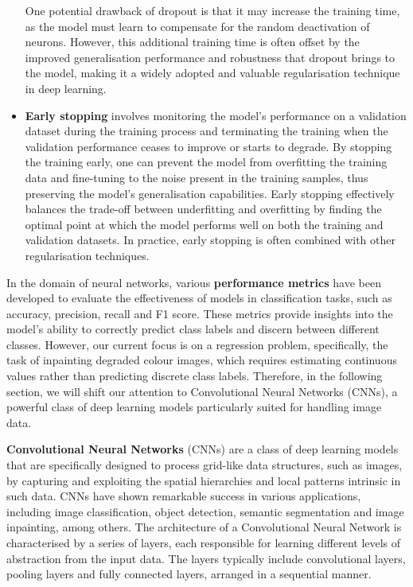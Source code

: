 \begin{itemize}[leftmargin=1.5em]
          One potential drawback of dropout is that it may increase the training time, as the model must learn to compensate for the random deactivation of neurons. However, this additional training time is often offset by the improved generalisation performance and robustness that dropout brings to the model, making it a widely adopted and valuable regularisation technique in deep learning.

    \item \textbf{Early stopping} involves monitoring the model's performance on a validation dataset during the training process and terminating the training when the validation performance ceases to improve or starts to degrade. By stopping the training early, one can prevent the model from overfitting the training data and fine-tuning to the noise present in the training samples, thus preserving the model's generalisation capabilities. Early stopping effectively balances the trade-off between underfitting and overfitting by finding the optimal point at which the model performs well on both the training and validation datasets. In practice, early stopping is often combined with other regularisation techniques.
\end{itemize}
\vspace{1em}

In the domain of neural networks, various \textbf{performance metrics} have been developed to evaluate the effectiveness of models in classification tasks, such as accuracy, precision, recall and F1 score. These metrics provide insights into the model's ability to correctly predict class labels and discern between different classes. However, our current focus is on a regression problem, specifically, the task of inpainting degraded colour images, which requires estimating continuous values rather than predicting discrete class labels. Therefore, in the following section, we will shift our attention to Convolutional Neural Networks (CNNs), a powerful class of deep learning models particularly suited for handling image data.

\label{section:cnn}

\textbf{Convolutional Neural Networks} (CNNs) are a class of deep learning models that are specifically designed to process grid-like data structures, such as images, by capturing and exploiting the spatial hierarchies and local patterns intrinsic in such data. CNNs have shown remarkable success in various applications, including image classification, object detection, semantic segmentation and image inpainting, among others. The architecture of a Convolutional Neural Network is characterised by a series of layers, each responsible for learning different levels of abstraction from the input data. The layers typically include convolutional layers, pooling layers and fully connected layers, arranged in a sequential manner.

